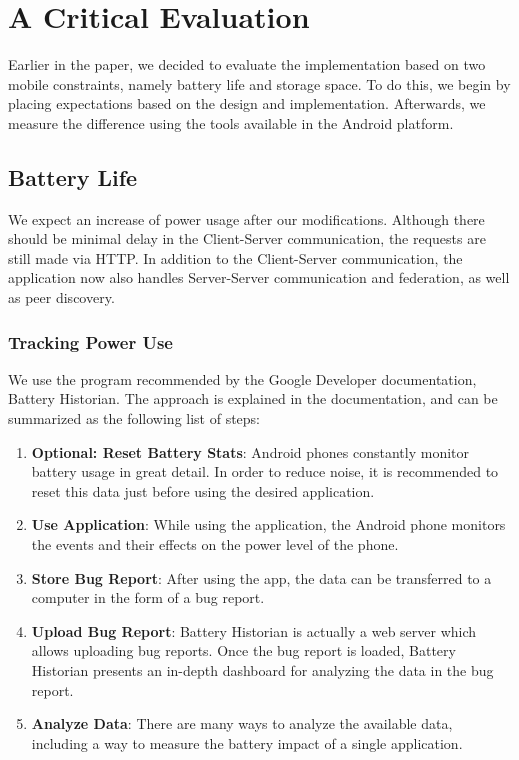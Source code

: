 \chapter{A Critical Evaluation}\label{chp:a_critical_evaluation}
Earlier in the paper, we decided to evaluate the implementation based on two mobile constraints, namely battery life and storage space.
To do this, we begin by placing expectations based on the design and implementation.
Afterwards, we measure the difference using the tools available in the Android platform.

\section{Battery Life}\label{sec:battery_life}
We expect an increase of power usage after our modifications.
Although there should be minimal delay in the Client-Server communication, the requests are still made via HTTP\@.
In addition to the Client-Server communication, the application now also handles Server-Server communication and federation, as well as peer discovery.

\subsection{Tracking Power Use}
We use the program recommended by the Google Developer documentation, Battery Historian\cite{battery_historian}.
The approach is explained in the documentation, and can be summarized as the following list of steps:
\begin{enumerate}
	\item{
	      \textbf{Optional: Reset Battery Stats}:
	      Android phones constantly monitor battery usage in great detail.
	      In order to reduce noise, it is recommended to reset this data just before using the desired application.
	      }
	\item{
	      \textbf{Use Application}:
	      While using the application, the Android phone monitors the events and their effects on the power level of the phone.
	      }
	\item{
	      \textbf{Store Bug Report}:
	      After using the app, the data can be transferred to a computer in the form of a bug report.
	      }
	\item{
	      \textbf{Upload Bug Report}:
	      Battery Historian is actually a web server which allows uploading bug reports.
	      Once the bug report is loaded, Battery Historian presents an in-depth dashboard for analyzing the data in the bug report.
	      }
	\item{
	      \textbf{Analyze Data}:
	      There are many ways to analyze the available data, including a way to measure the battery impact of a single application.
	      }
\end{enumerate}

